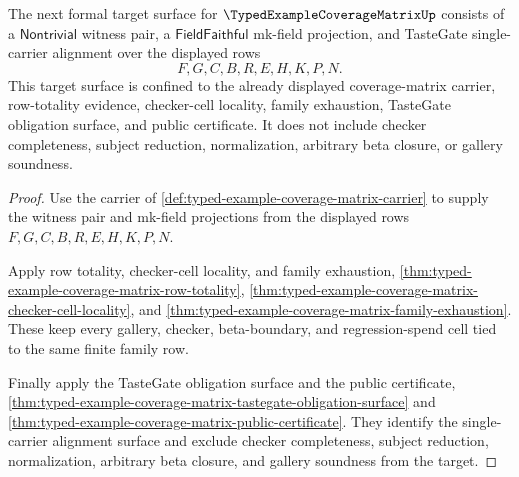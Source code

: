 \begin{theorem}
\label{thm:typed-example-coverage-matrix-formal-target-row}
The next formal target surface for $\TypedExampleCoverageMatrixUp$ consists of a $\mathsf{Nontrivial}$ witness pair, a $\mathsf{FieldFaithful}$ mk-field projection, and TasteGate single-carrier alignment over the displayed rows
$$
F,G,C,B,R,E,H,K,P,N .
$$
This target surface is confined to the already displayed coverage-matrix carrier, row-totality evidence, checker-cell locality, family exhaustion, TasteGate obligation surface, and public certificate. It does not include checker completeness, subject reduction, normalization, arbitrary beta closure, or gallery soundness.
\end{theorem}
\begin{proof}
Use the carrier of \autoref{def:typed-example-coverage-matrix-carrier} to supply the witness pair and mk-field projections from the displayed rows $F,G,C,B,R,E,H,K,P,N$.

Apply row totality, checker-cell locality, and family exhaustion, \autoref{thm:typed-example-coverage-matrix-row-totality}, \autoref{thm:typed-example-coverage-matrix-checker-cell-locality}, and \autoref{thm:typed-example-coverage-matrix-family-exhaustion}. These keep every gallery, checker, beta-boundary, and regression-spend cell tied to the same finite family row.

Finally apply the TasteGate obligation surface and the public certificate, \autoref{thm:typed-example-coverage-matrix-tastegate-obligation-surface} and \autoref{thm:typed-example-coverage-matrix-public-certificate}. They identify the single-carrier alignment surface and exclude checker completeness, subject reduction, normalization, arbitrary beta closure, and gallery soundness from the target.
\end{proof}

